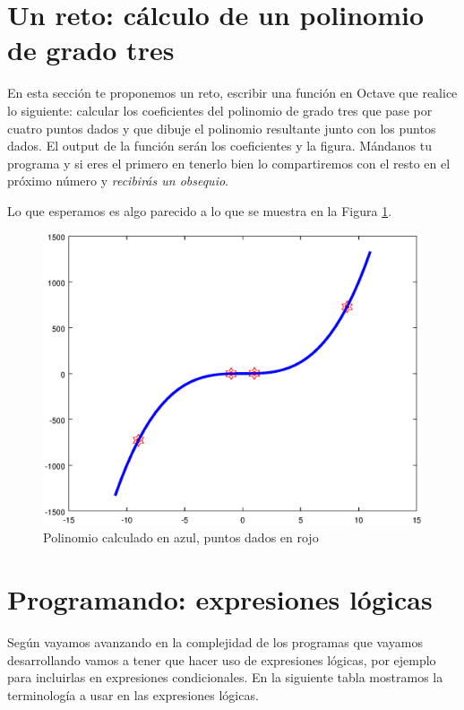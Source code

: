 \section{Un reto: cálculo de un polinomio de grado tres}
En esta sección te proponemos un reto, escribir una función en Octave que realice lo siguiente: calcular los coeficientes del polinomio de grado tres que pase por cuatro puntos dados y que dibuje el polinomio resultante junto con los puntos dados. El output de la función serán los coeficientes y la figura. Mándanos tu programa y si eres el primero en tenerlo bien lo compartiremos con el resto en el próximo número y \textsl{recibirás un obsequio}.

Lo que esperamos es algo parecido a lo que se muestra en la Figura \ref{fig:pol3}.
\begin{figure}[ht!]
\begin{figurebox}
\begin{center}
\includegraphics[scale=0.2]{polinomios3.eps}
\end{center}\caption{Polinomio calculado en azul, puntos dados en rojo}\label{fig:pol3}
\end{figurebox}
\end{figure}



\section{Programando: expresiones lógicas}
Según vayamos avanzando en la complejidad de los programas que vayamos desarrollando vamos a tener que hacer uso de expresiones lógicas, por ejemplo para incluirlas en expresiones condicionales. En la siguiente tabla mostramos la terminología a usar en las expresiones lógicas.


